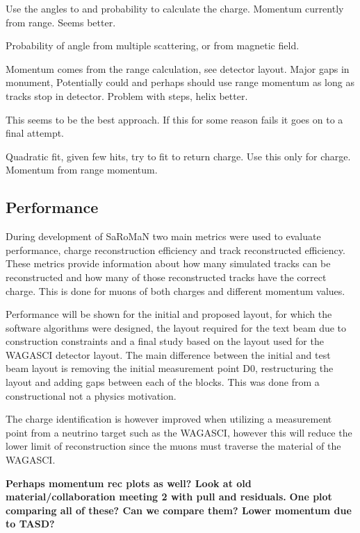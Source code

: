 Use the angles to and probability to calculate the charge. Momentum currently from range. Seems better.

Probability of angle from multiple scattering, or from magnetic field. 

Momentum comes from the range calculation, see detector layout. Major gaps in monument,  Potentially could and perhaps should use range momentum as long as tracks stop in detector. Problem with steps, helix better.



This seems to be the best approach. If this for some reason fails it goes on to a final attempt.

Quadratic fit, given few hits, try to fit to return charge. Use this only for charge. Momentum from range momentum.

\subsection{Performance}
During development of SaRoMaN two main metrics were used to evaluate performance, charge reconstruction efficiency and track reconstructed efficiency. These metrics provide information about how many simulated tracks can be reconstructed and how many of those reconstructed tracks have the correct charge. This is done for muons of both charges and different momentum values.

Performance will be shown for the initial and proposed layout, for which the software algorithms were designed, the layout required for the text beam due to construction constraints and a final study based on the layout used for the WAGASCI detector layout. The main difference between the initial and test beam layout is removing the initial measurement point D0, restructuring  the layout and adding gaps between each of the blocks. This was done from a constructional not a physics motivation.

The charge identification is however improved when utilizing a measurement point from a neutrino target such as the WAGASCI, however this will reduce the lower limit of reconstruction since the muons must traverse the material of the WAGASCI. 

\textbf{Perhaps momentum rec plots as well? Look at old material/collaboration meeting 2 with pull and residuals.}
\textbf{One plot comparing all of these? Can we compare them? Lower momentum due to TASD?}

